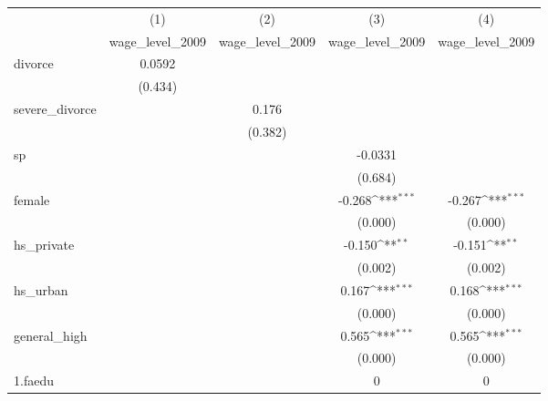 {
\def\sym#1{\ifmmode^{#1}\else\(^{#1}\)\fi}
\begin{tabular}{l*{4}{c}}
\hline\hline
            &\multicolumn{1}{c}{(1)}&\multicolumn{1}{c}{(2)}&\multicolumn{1}{c}{(3)}&\multicolumn{1}{c}{(4)}\\
            &\multicolumn{1}{c}{wage\_level\_2009}&\multicolumn{1}{c}{wage\_level\_2009}&\multicolumn{1}{c}{wage\_level\_2009}&\multicolumn{1}{c}{wage\_level\_2009}\\
\hline
divorce     &      0.0592         &                     &                     &                     \\
            &     (0.434)         &                     &                     &                     \\
[1em]
severe\_divorce&                     &       0.176         &                     &                     \\
            &                     &     (0.382)         &                     &                     \\
[1em]
sp          &                     &                     &     -0.0331         &                     \\
            &                     &                     &     (0.684)         &                     \\
[1em]
female      &                     &                     &      -0.268\sym{***}&      -0.267\sym{***}\\
            &                     &                     &     (0.000)         &     (0.000)         \\
[1em]
hs\_private  &                     &                     &      -0.150\sym{**} &      -0.151\sym{**} \\
            &                     &                     &     (0.002)         &     (0.002)         \\
[1em]
hs\_urban    &                     &                     &       0.167\sym{***}&       0.168\sym{***}\\
            &                     &                     &     (0.000)         &     (0.000)         \\
[1em]
general\_high&                     &                     &       0.565\sym{***}&       0.565\sym{***}\\
            &                     &                     &     (0.000)         &     (0.000)         \\
[1em]
1.faedu     &                     &                     &           0         &           0         \\

\end{tabular}}
